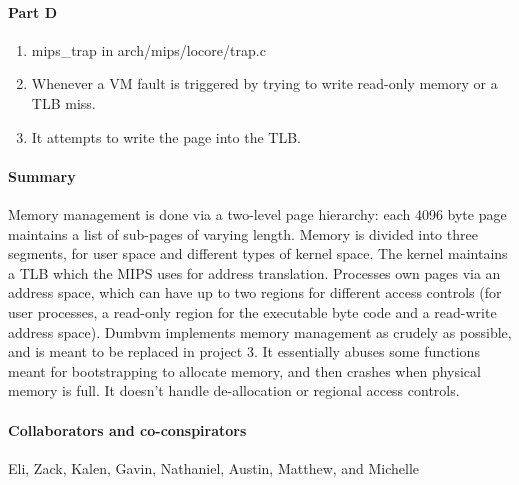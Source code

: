 \documentclass{proc}
\begin{document}
\paragraph{Part D}
\begin{enumerate}
	\item mips\_trap in arch/mips/locore/trap.c
	\item Whenever a VM fault is triggered by trying to write read-only memory or a TLB miss.
	\item It attempts to write the page into the TLB.
\end{enumerate}

\paragraph{Summary} Memory management is done via a two-level page hierarchy: each 4096 byte page maintains a list of sub-pages of varying length. Memory is divided into three segments, for user space and different types of kernel space. The kernel maintains a TLB which the MIPS uses for address translation. Processes own pages via an address space, which can have up to two regions for different access controls (for user processes, a read-only region for the executable byte code and a read-write address space). Dumbvm implements memory management as crudely as possible, and is meant to be replaced in project 3. It essentially abuses some functions meant for bootstrapping to allocate memory, and then crashes when physical memory is full. It doesn't handle de-allocation or regional access controls.

\paragraph{Collaborators and co-conspirators} Eli, Zack, Kalen, Gavin, Nathaniel, Austin, Matthew, and Michelle 
\end{document}
